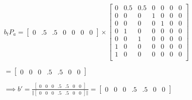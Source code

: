 \documentclass[12pt]{article}
\begin{document}
$ b_t P_a = \begin{bmatrix}0 & .5 & .5 & 0 & 0 & 0 & 0\end{bmatrix} \times \begin{bmatrix}
0   & 0.5 & 0.5 & 0   & 0   & 0   & 0 \\
0   & 0   & 0   & 1   & 0   & 0   & 0 \\
0   & 0   & 0   & 0   & 1   & 0   & 0 \\
0   & 1   & 0   & 0   & 0   & 0   & 0 \\
0   & 0   & 1   & 0   & 0   & 0   & 0 \\
1   & 0   & 0   & 0   & 0   & 0   & 0 \\
1   & 0   & 0   & 0   & 0   & 0   & 0 \\
\end{bmatrix}$

$ = \begin{bmatrix}0 & 0 & 0 & .5 & .5 & 0 & 0 \end{bmatrix} $

$\implies b' = \frac{\begin{bmatrix}0 & 0 & 0 & .5 & .5 & 0 & 0 \end{bmatrix}}{\Vert\begin{bmatrix}0 & 0 & 0 & .5 & .5 & 0 & 0 \end{bmatrix}\Vert} = \begin{bmatrix}0 & 0 & 0 & .5 & .5 & 0 & 0 \end{bmatrix}$
\end{document}
